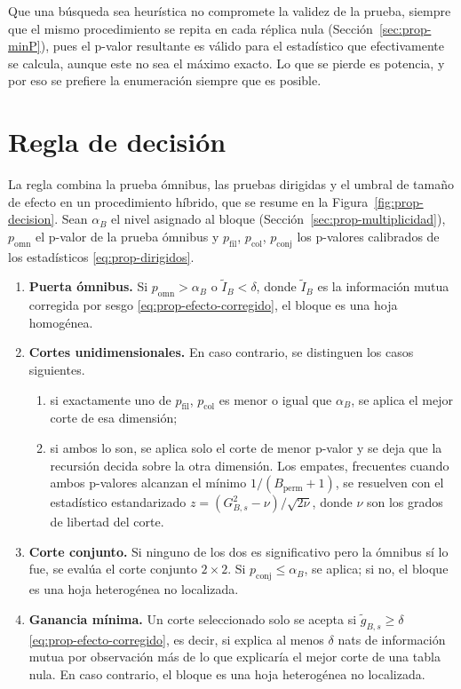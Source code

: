 Que una búsqueda sea heurística no compromete la validez de la prueba, siempre
que el mismo procedimiento se repita en cada réplica nula
(Sección~\ref{sec:prop-minP}), pues el p-valor resultante es válido para el
estadístico que efectivamente se calcula, aunque este no sea el máximo exacto.
Lo que se pierde es potencia, y por eso se prefiere la enumeración siempre que
es posible.

\section{Regla de decisión}\label{sec:prop-decision}

La regla combina la prueba ómnibus, las pruebas dirigidas y el umbral de tamaño
de efecto en un procedimiento híbrido, que se resume en la
Figura~\ref{fig:prop-decision}. Sean $\alpha_B$ el nivel asignado al bloque
(Sección~\ref{sec:prop-multiplicidad}), $p_{\mathrm{omn}}$ el p-valor de la
prueba ómnibus y $p_{\mathrm{fil}}$, $p_{\mathrm{col}}$, $p_{\mathrm{conj}}$ los
p-valores calibrados de los estadísticos \eqref{eq:prop-dirigidos}.

\begin{enumerate}
  \item \textbf{Puerta ómnibus.} Si $p_{\mathrm{omn}}>\alpha_B$ o
  $\tilde I_B<\delta$, donde $\tilde I_B$ es la información mutua corregida por
  sesgo \eqref{eq:prop-efecto-corregido}, el bloque es una hoja
  homogénea.
  \item \textbf{Cortes unidimensionales.} En caso contrario, se distinguen los
  casos siguientes.
  \begin{enumerate}
    \item si exactamente uno de $p_{\mathrm{fil}}$, $p_{\mathrm{col}}$ es
    menor o igual que $\alpha_B$, se aplica el mejor corte de esa dimensión;
    \item si ambos lo son, se aplica solo el corte de menor p-valor y se deja
    que la recursión decida sobre la otra dimensión. Los empates, frecuentes
    cuando ambos p-valores alcanzan el mínimo $1/(B_{\mathrm{perm}}+1)$, se
    resuelven con el estadístico estandarizado
    $z = (G^2_{B,s}-\nu)/\sqrt{2\nu}$, donde $\nu$ son los grados de libertad
    del corte.
  \end{enumerate}
  \item \textbf{Corte conjunto.} Si ninguno de los dos es significativo pero
  la ómnibus sí lo fue, se evalúa el corte conjunto $2\times2$. Si
  $p_{\mathrm{conj}}\le\alpha_B$, se aplica; si no, el bloque es una hoja
  heterogénea no localizada.
  \item \textbf{Ganancia mínima.} Un corte seleccionado solo se acepta si
  $\tilde g_{B,s}\ge\delta$ \eqref{eq:prop-efecto-corregido}, es decir, si explica al menos $\delta$ nats
  de información mutua por observación más de lo que explicaría el mejor corte
  de una tabla nula. En caso contrario, el bloque es una
  hoja heterogénea no localizada.
\end{enumerate}

